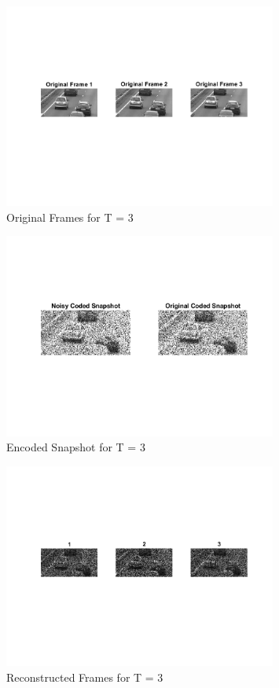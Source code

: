 \documentclass[a4paper,12pt]{article}
\begin{document}
\begin{figure}[htbp]
    \centering
    \includegraphics[width=0.8\textwidth]{../images/original_frames.png}
    \caption{Original Frames for T = 3}

\end{figure}

\begin{figure}[htbp]
    \centering
    \includegraphics[width=0.8\textwidth]{../images/noisy_coded_snapshot.png}
    \caption{Encoded Snapshot for T = 3}

\end{figure}

\begin{figure}[htbp]
    \centering
    \includegraphics[width=0.8\textwidth]{../images/reconstructed_frames.png}
    \caption{Reconstructed Frames for T = 3}

\end{figure}
\end{document}
